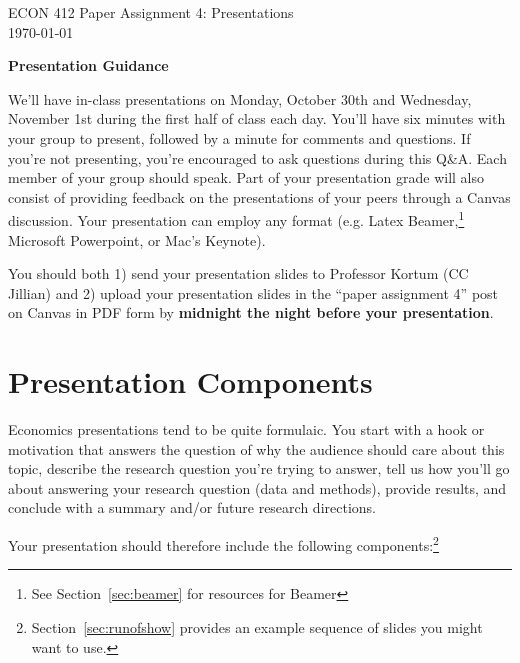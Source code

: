  \noindent
\begin{minipage}[t]{.8\textwidth}
\raggedright
	\Large ECON 412 Paper Assignment 4: Presentations \\
 	\today \\[1.5em] %
\end{minipage}%

\noindent

\textbf{\Large{Presentation Guidance}}

We'll have in-class presentations on Monday, October 30th and Wednesday, November 1st during the first half of class each day. You'll have six minutes with your group to present, followed by a minute for comments and questions. If you're not presenting, you're encouraged to ask questions during this Q\&A. Each member of your group should speak. Part of your presentation grade will also consist of providing feedback on the presentations of your peers through a Canvas discussion. Your presentation can employ any format (e.g. Latex Beamer,\footnote{See Section~\ref{sec:beamer} for resources for Beamer} Microsoft Powerpoint, or Mac's Keynote).

You should both 1) send your presentation slides to Professor Kortum (CC Jillian) and 2) upload your presentation slides in the ``paper assignment 4'' post on Canvas in PDF form by \textbf{midnight the night before your presentation}.


\section{Presentation Components}
Economics presentations tend to be quite formulaic. You start with a hook or motivation that answers the question of why the audience should care about this topic, describe the research question you're trying to answer, tell us how you'll go about answering your research question (data and methods), provide results, and conclude with a summary and/or future research directions.

Your presentation should therefore include the following components:\footnote{Section~\ref{sec:runofshow} provides an example sequence of slides you might want to use.}


